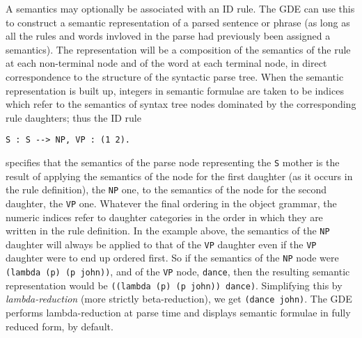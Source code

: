 A semantics may optionally be associated with an ID rule. The GDE can use
this to construct a semantic representation of a parsed sentence or
phrase (as long as all the rules and words
invloved in the parse had previously been assigned a semantics).
The representation will be a composition of the
semantics of the rule at each non-terminal node and of the
word at each terminal node, in direct correspondence to the structure of
the syntactic parse tree.
When the semantic representation is built up, integers in semantic
formulae are taken to be indices which refer to the semantics of syntax
tree nodes dominated by the corresponding rule daughters; thus the ID rule
\begin{ex}
\begin{verbatim}
S : S --> NP, VP : (1 2).
\end{verbatim}
\end{ex}
specifies that the semantics of the parse node representing the
{\tt S} mother is the result of applying the semantics of the node
for the first daughter (as it occurs in
the rule definition), the {\tt NP} one, to the semantics
of the node for the second daughter, the {\tt VP} one.
Whatever the final ordering in the object grammar, the numeric
indices refer to daughter categories
in the order in which they are written in the rule definition.
In the example above, the semantics of the {\tt NP} daughter will
always be applied to that of the {\tt VP} daughter even if the
{\tt VP} daughter were to end up ordered first. So if the
semantics of the {\tt NP} node were {\tt (lambda (p) (p john))},
and of the {\tt VP} node, {\tt dance}, then the resulting semantic
representation would be {\tt ((lambda (p) (p john)) dance)}.
Simplifying this by {\it lambda-reduction} (more strictly beta-reduction),
we get {\tt (dance john)}. The GDE performs lambda-reduction at parse
time and displays semantic formulae in fully reduced form, by default.

